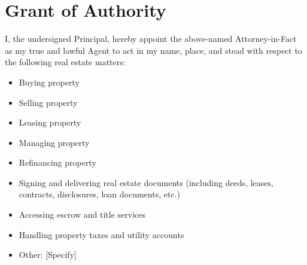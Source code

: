 
\section{Grant of Authority}
\label{sec:authority}

I, the undersigned Principal, hereby appoint the above-named Attorney-in-Fact as my true and lawful Agent to act in my name, place, and stead with respect to the following real estate matters: 
\begin{itemize}
  \item[$\square$] Buying property
  \item[$\square$] Selling property
  \item[$\square$] Leasing property
  \item[$\square$] Managing property
  \item[$\square$] Refinancing property
  \item[$\square$] Signing and delivering real estate documents (including deeds, leases, contracts, disclosures, loan documents, etc.)
  \item[$\square$] Accessing escrow and title services
  \item[$\square$] Handling property taxes and utility accounts
  \item[$\square$] Other: [Specify]
\end{itemize}

